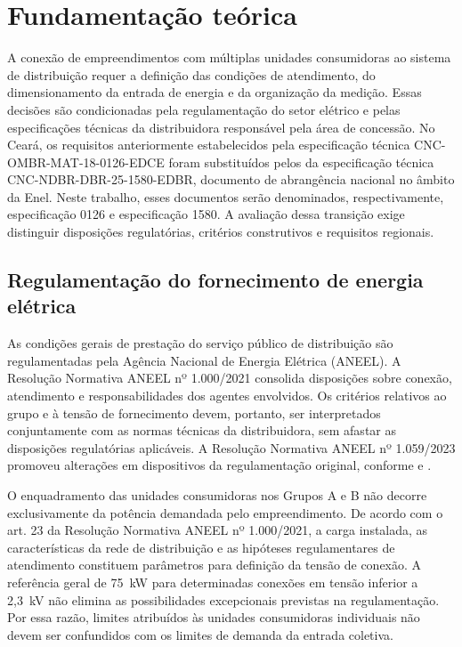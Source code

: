 \chapter{Fundamentação teórica}
\label{cap:fundamentacao}

A conexão de empreendimentos com múltiplas unidades consumidoras ao sistema de distribuição requer a definição das condições de atendimento, do dimensionamento da entrada de energia e da organização da medição. Essas decisões são condicionadas pela regulamentação do setor elétrico e pelas especificações técnicas da distribuidora responsável pela área de concessão. No Ceará, os requisitos anteriormente estabelecidos pela especificação técnica CNC-OMBR-MAT-18-0126-EDCE foram substituídos pelos da especificação técnica CNC-NDBR-DBR-25-1580-EDBR, documento de abrangência nacional no âmbito da Enel. Neste trabalho, esses documentos serão denominados, respectivamente, especificação 0126 e especificação 1580. A avaliação dessa transição exige distinguir disposições regulatórias, critérios construtivos e requisitos regionais.

\section{Regulamentação do fornecimento de energia elétrica}
\label{sec:regulamentacao}

As condições gerais de prestação do serviço público de distribuição são regulamentadas pela Agência Nacional de Energia Elétrica (ANEEL). A Resolução Normativa ANEEL nº 1.000/2021 consolida disposições sobre conexão, atendimento e responsabilidades dos agentes envolvidos. Os critérios relativos ao grupo e à tensão de fornecimento devem, portanto, ser interpretados conjuntamente com as normas técnicas da distribuidora, sem afastar as disposições regulatórias aplicáveis. A Resolução Normativa ANEEL nº 1.059/2023 promoveu alterações em dispositivos da regulamentação original, conforme  e .

O enquadramento das unidades consumidoras nos Grupos A e B não decorre exclusivamente da potência demandada pelo empreendimento. De acordo com o art. 23 da Resolução Normativa ANEEL nº 1.000/2021, a carga instalada, as características da rede de distribuição e as hipóteses regulamentares de atendimento constituem parâmetros para definição da tensão de conexão. A referência geral de 75~kW para determinadas conexões em tensão inferior a 2,3~kV não elimina as possibilidades excepcionais previstas na regulamentação. Por essa razão, limites atribuídos às unidades consumidoras individuais não devem ser confundidos com os limites de demanda da entrada coletiva.

